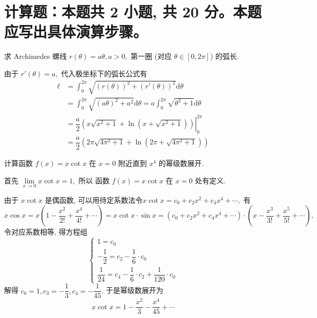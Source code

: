 \section{计算题：本题共 2 小题, 共 20 分。本题应写出具体演算步骤。}


\begin{question}[points = 10]
求 Archimedes 螺线 $r(\theta) = a\theta, a > 0,$ 第一圈 (对应 $\theta \in [0, 2\pi]$) 的弧长.

\end{question}

\begin{solution}
由于 $r'(\theta) = a,$ 代入极坐标下的弧长公式有
\begin{align*}
\ell & = \int_{0}^{2\pi} \sqrt{\left(r(\theta)\right)^2 + \left(r'(\theta)\right)^2} \mathrm{d} \theta \\
& = \int_{0}^{2\pi} \sqrt{\left(a \theta\right)^2 + a^2} \mathrm{d} \theta = a \int_{0}^{2\pi} \sqrt{\theta^2 + 1} \mathrm{d} \theta \\
& = \left. \dfrac{a}{2} \left( x \sqrt{x^2 + 1} + \ln \left( x + \sqrt{x^2 + 1} \right) \right) \right|_{0}^{2\pi} \\
& = \dfrac{a}{2} \left( 2\pi \sqrt{4 \pi^2 + 1} + \ln \left( 2\pi + \sqrt{4 \pi^2 + 1} \right) \right)
\end{align*}
\end{solution}

\begin{question}[points = 10]
计算函数 $f(x) = x\cot x$ 在 $x = 0$ 附近直到 $x^4$ 的幂级数展开.

\end{question}

\begin{solution}
首先 $\lim\limits_{x \to 0} x\cot x = 1,$ 所以 函数 $f(x) = x\cot x$ 在 $x = 0$ 处有定义.

由于 $x\cot x$ 是偶函数, 可以用待定系数法令$x\cot x = c_0 + c_2 x^2 + c_4 x^4 + \cdots,$ 有
\[x\cos x = x\left( 1 - \dfrac{x^2}{2!} + \dfrac{x^4}{4!} + \cdots \right) = x\cot x \cdot \sin x = \left( c_0 + c_2 x^2 + c_4 x^4 + \cdots \right) \cdot \left(x - \dfrac{x^3}{3!} + \dfrac{x^5}{5!} + \cdots\right),\]
令对应系数相等, 得方程组
\[\begin{cases}
1 = c_0 \\
-\dfrac{1}{2} = c_2 - \dfrac{1}{6} \cdot c_0 \\
\dfrac{1}{24} = c_4 - \dfrac{1}{6} \cdot c_2 + \dfrac{1}{120} \cdot c_0
\end{cases}\]
解得 $c_0 = 1, c_3 = - \dfrac{1}{3}, c_4 = - \dfrac{1}{45}.$ 于是幂级数展开为
\[x\cot x = 1 - \dfrac{x^2}{3} - \dfrac{x^4}{45} + \cdots\]
\end{solution}

